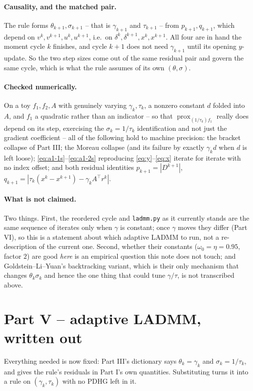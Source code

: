 \documentclass[11pt]{article}
\newcommand{\code}[1]{\texttt{#1}}
\newcommand{\prox}{\operatorname{prox}}
\begin{document}
\paragraph{Causality, and the matched pair.}
The rule forms $\theta_{k+1},\sigma_{k+1}$ -- that is $\gamma_{k+1}$ and
$\tau_{k+1}$ -- from $p_{k+1},q_{k+1}$, which depend on
$v^k,v^{k+1},u^k,u^{k+1}$, i.e.\ on $\delta^k,\delta^{k+1},x^k,x^{k+1}$. All four
are in hand the moment cycle $k$ finishes, and cycle $k+1$ does not need
$\gamma_{k+1}$ until its opening $y$-update. So the two step sizes come out of the
same residual pair and govern the same cycle, which is what the rule assumes of
its own $(\theta,\sigma)$.

\paragraph{Checked numerically.}
On a toy $f_1,f_2,A$ with genuinely varying $\gamma_k,\tau_k$, a nonzero constant
$d$ folded into $A$, and $f_1$ a quadratic rather than an indicator -- so that
$\prox_{(1/\tau_k)f_1}$ really does depend on its step, exercising the
$\sigma_k=1/\tau_k$ identification and not just the gradient coefficient -- all of
the following hold to machine precision: the bracket collapse of Part III; the
Moreau collapse (and its failure by exactly $\gamma_kd$ when $d$ is left loose);
\eqref{eq:a1-1s}--\eqref{eq:a1-2s} reproducing \eqref{eq:y}--\eqref{eq:x} iterate
for iterate with no index offset; and both residual identities
$p_{k+1}=|D^{k+1}|$, $q_{k+1}=|\tau_k(x^k-x^{k+1})-\gamma_kA^\top r^k|$.

\paragraph{What is not claimed.}
Two things. First, the reordered cycle and \code{ladmm.py} as it currently stands
are the same sequence of iterates only when $\gamma$ is constant; once $\gamma$
moves they differ (Part VI), so this is a statement about which adaptive LADMM to
run, not a re-description of the current one. Second, whether their
constants ($\omega_0=\eta=0.95$, factor $2$) are good \emph{here} is an
empirical question this note does not touch; and Goldstein--Li--Yuan's
backtracking variant, which is their only mechanism that changes
$\theta_k\sigma_k$ and hence the one thing that could tune $\gamma/\tau$, is not
transcribed above.

\section*{Part V -- adaptive LADMM, written out}
Everything needed is now fixed: Part III's dictionary says $\theta_k=\gamma_k$
and $\sigma_k=1/\tau_k$, and gives the rule's residuals in Part I's own
quantities. Substituting turns it into a rule on $(\gamma_k,\tau_k)$ with
no PDHG left in it.
\end{document}
